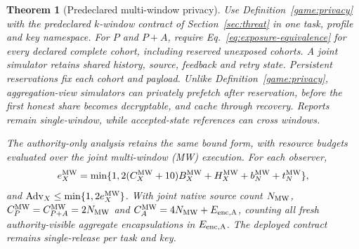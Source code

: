 \documentclass[conference,compsoc]{IEEEtran}
\theoremstyle{definition}
\numberwithin{equation}{section}
\numberwithin{table}{section}
\numberwithin{figure}{section}
\theoremstyle{plain}
\newtheorem{theorem}{Theorem}[section]
\newtheorem{theorem}{Theorem}
\begin{document}
\begin{theorem}[Predeclared multi-window privacy]
\label{thm:multi-window-privacy}
Use Definition~\ref{game:privacy} with the predeclared \(k\)-window contract
of Section~\ref{sec:threat} in one task, profile and key namespace.
For \(P\) and \(P{+}A\), require Eq.~\eqref{eq:exposure-equivalence}
for every declared complete cohort, including reserved unexposed cohorts.
A joint simulator retains shared history, source, feedback and retry
state. Persistent reservations fix each cohort and payload. Unlike
Definition~\ref{game:privacy}, aggregation-view simulators can privately
prefetch after reservation, before the first honest share becomes
decryptable, and cache through recovery. Reports remain single-window, while accepted-state references
can cross windows.

The authority-only analysis retains the same bound form, with resource
budgets evaluated over the joint multi-window (MW) execution. For each observer,
\[
 e_X^{\rm MW}=\min\{1,2(C_X^{\rm MW}+10)B_X^{\rm MW}
                  +H_X^{\rm MW}+b_N^{\rm MW}+t_N^{\rm MW}\},
\]
and \(\operatorname{Adv}_X\le\min\{1,2e_X^{\rm MW}\}\).
With joint native source count \(N_{\rm MW}\),
\(C_P^{\rm MW}=C_{P+A}^{\rm MW}=2N_{\rm MW}\) and
\(C_A^{\rm MW}=4N_{\rm MW}+E_{\rm enc,A}\), counting all fresh
authority-visible aggregate encapsulations in \(E_{\rm enc,A}\).
The deployed contract remains single-release per task and key.
\end{theorem}
\end{document}
